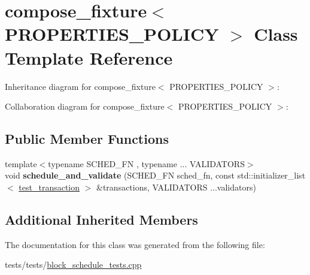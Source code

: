 \hypertarget{classcompose__fixture}{}\section{compose\+\_\+fixture$<$ P\+R\+O\+P\+E\+R\+T\+I\+E\+S\+\_\+\+P\+O\+L\+I\+CY $>$ Class Template Reference}
\label{classcompose__fixture}


Inheritance diagram for compose\+\_\+fixture$<$ P\+R\+O\+P\+E\+R\+T\+I\+E\+S\+\_\+\+P\+O\+L\+I\+CY $>$\+:


Collaboration diagram for compose\+\_\+fixture$<$ P\+R\+O\+P\+E\+R\+T\+I\+E\+S\+\_\+\+P\+O\+L\+I\+CY $>$\+:
\subsection*{Public Member Functions}
\begin{DoxyCompactItemize}
\item 
\mbox{\label{classcompose__fixture_a69671f75c8b4c505cbc7d5ed8cb22058}} 
{\footnotesize template$<$typename S\+C\+H\+E\+D\+\_\+\+FN , typename ... V\+A\+L\+I\+D\+A\+T\+O\+RS$>$ }\\void {\bfseries schedule\+\_\+and\+\_\+validate} (S\+C\+H\+E\+D\+\_\+\+FN sched\+\_\+fn, const std\+::initializer\+\_\+list$<$ \mbox{\hyperlink{structcommon__fixture_1_1test__transaction}{test\+\_\+transaction}} $>$ \&transactions, V\+A\+L\+I\+D\+A\+T\+O\+RS ...validators)
\end{DoxyCompactItemize}
\subsection*{Additional Inherited Members}


The documentation for this class was generated from the following file\+:\begin{DoxyCompactItemize}
\item 
tests/tests/\mbox{\hyperlink{block__schedule__tests_8cpp}{block\+\_\+schedule\+\_\+tests.\+cpp}}\end{DoxyCompactItemize}
